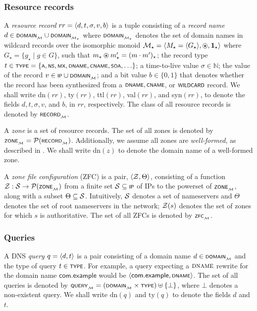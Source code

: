 \subsubsection{Resource records}

A \emph{resource record} $rr=\tup{d,t,\sigma,v,b}$ is a tuple consisting
of a \emph{record name} $d\in\scrsf{domain}\subsub{\monoid} \cup \scrsf{domain}\subsub{\monoid_{\star}}$ where
$\scrsf{domain}\subsub{\monoid_{\star}}$ denotes the set of domain names in wildcard records over the isomorphic monoid $\monoid_{\star} = \tup{M_\star = \tup{G_\star},\ostar,\mathbf{1}_{\star}}$ where $G_\star = \{g_\star \mid g\in G\}$, such that $m_{\star}\ostar m_{\star}' = (m \cdot m')_{\star}$; the record type $t\in\scrsf{type}=\{\scrsf{a},\scrsf{ns},\scrsf{mx},\scrsf{dname},\scrsf{cname},\scrsf{soa},\ldots\}$;
a time-to-live value $\sigma\in\mathbb{N}$; the value of the record
$v\in\scrsf{ip}\cup\scrsf{domain}\subsub{\monoid}$;
and a bit value $b\in\{0,1\}$ that denotes whether the record has
been synthesized from a $\scrsf{dname},\scrsf{cname}$, or $\scrsf{wildcard}$
record. We shall write dn$(rr)$, ty$(rr)$, ttl$(rr)$, val$(rr)$, and syn$(rr)$, to denote the fields $d,t,\sigma,v$, and $b$, in $rr$,
respectively. The class of all resource records is denoted by $\scrsf{record}\subsub{\monoid}$.

A \emph{zone} is a set of resource records. The set of all zones is denoted
by $\scrsf{zone}\subsub{\monoid}={\cal P}(\scrsf{record}\subsub{\monoid})$. Additionally, we assume
all zones are \emph{well-formed}, as described in \cite[Appendix A]{groot}. We shall
write $\text{dn}(z)$ to denote the domain name of a well-formed zone.

A \emph{zone file configuration} (ZFC) is a pair, $\tup{\cal Z, \Theta}$, consisting of a function $\cal Z : \cal S \rightarrow \cal P(\scrsf{zone}\subsub{\monoid})$ from a finite set $\cal S \subseteq \scrsf{ip}$ of IPs to the powerset of $\scrsf{zone}\subsub{\monoid}$, along with a subset $\Theta \subseteq \cal S$. Intuitively, $\cal S$ denotes a set of nameservers and $\Theta$ denotes the set of root nameservers in the network; $\cal Z(s)$ denotes the set of zones for which $s$ is authoritative. The set of all ZFCs is denoted by $\scrsf{zfc}\subsub{\monoid}$.

\subsubsection{Queries}

A DNS \emph{query} $q=\tup{d,t}$ is a pair consisting of a domain
name $d\in\scrsf{domain}\subsub{\monoid}$ and the type of query $t\in\scrsf{type}$.
For example, a query expecting a $\rtype{dname}$ rewrite for the domain name
$\mathsf{{com.example}}$ would be $\tup{\mathsf{com.example},\scrsf{dname}}$.
The set of all queries is denoted by $\scrsf{query}\subsub{\monoid}=(\scrsf{domain}\subsub{\monoid}\times\scrsf{type})\uplus\{\bot\}$,
where $\bot$ denotes a non-existent query. We shall write $\text{dn}(q)$
and $\text{ty}(q)$ to denote the fields $d$ and $t$.

